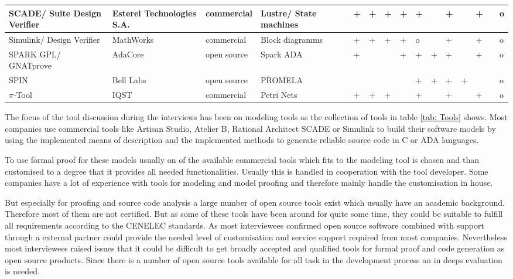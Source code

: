 \documentclass{./template/openetcs2}
\begin{document}
\begin{landscape}
\begin{center}
\begin{longtable}{|m{2.5cm}|p{3cm}|m{1.8cm}|p{3.5cm}||m{1.2cm}|m{0.2cm}|m{0.2cm}|m{0.2cm}|m{0.7cm}|m{0.2cm}|m{0.7cm}|m{0.2cm}|m{0.6cm}|m{1.2cm}|m{0.2cm}|m{0.2cm}|}
SCADE/  Suite Design Verifier&Esterel Technologies S.A.&commercial&Lustre/ State machines&&+&+&+&+&+&&+&&+&&o \\ \hline
Simulink/ Design Verifier&MathWorks&commercial&Block diagramms&&+&+&+&+&o&&+&&+&&o \\ \hline
SPARK GPL/ GNATprove&AdaCore&open source&Spark ADA&&+&&&+&+&+&+&&+&&o \\ \hline
SPIN&Bell Labs&open source&PROMELA&&&&&&+&+&+&+&&&o \\ \hline
$\pi$-Tool&IQST&commercial&Petri Nets&&+&+&+&&+&&+&&+&&o \\ \hline

\end{longtable}

\end{center}
\end{landscape}

The focus of the tool discussion during the interviews has been on modeling tools as the collection of tools in table \ref{tab: Tools} shows. Most companies use commercial tools like Artisan Studio, Atelier B,  Rational Architect  SCADE or Simulink to build their software models by using the implemented means of description and the implemented methods to generate reliable source code in C or ADA languages. 

To use formal proof for these models usually on of the available commercial tools which fits to the modeling tool is chosen and than customised to a degree that it provides all needed functionalities. Usually this is handled in cooperation with the tool developer. Some companies have a lot of experience with tools for modeling and model proofing and therefore mainly handle the customisation in house.

But especially for proofing and source code analysis a large number of open source tools exist which usually have an academic background. Therefore most of them are not certified. But as some of these tools have been around for quite some time, they could be suitable to fulfill all requirements according to the CENELEC standards. As most interviewees confirmed open source software combined with support through a external partner could provide the needed level of customisation and service support required from most companies. Nevertheless most interviewees raised issues that it could be difficult to get broadly accepted and qualified tools for formal proof and code generation as open source products. Since there is a number of open source tools available for all task in the development process an in deeps evaluation is needed. 
\end{document}
